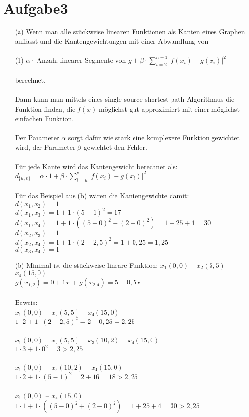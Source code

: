 \documentclass{article}
\begin{document}
\section*{Aufgabe3}
\begin{enumerate}
\item[(a)] Wenn man alle stückweise linearen Funktionen als Kanten eines Graphen auffasst und die Kantengewichtungen mit einer Abwandlung von \\\\
(1) $ \alpha \cdot$ Anzahl linearer Segmente von $g + \beta \cdot \sum_{i=2}^{n-1} \lvert f(x_i)-g(x_i) \lvert ^2$ \\\\
berechnet. \\\\
Dann kann man mittels eines single source shortest path Algorithmus die Funktion finden, die $f(x)$ möglichst gut approximiert mit einer möglichst einfachen Funktion. \\\\
Der Parameter $\alpha$ sorgt dafür wie stark eine komplexere Funktion gewichtet wird, der Parameter $\beta$ gewichtet den Fehler.\\\\
Für jede Kante wird das Kantengewicht berechnet als:\\
 $d_{\{u,v\}} = \alpha \cdot 1 + \beta \cdot \sum_{i=u}^{v} \lvert f(x_i)-g(x_i) \lvert ^2$\\\\
 Für das Beispiel aus (b) wären die Kantengewichte damit:\\
 $d(x_1,x_2) = 1$ \\
 $d(x_1,x_3) = 1 + 1 \cdot (5-1)^2 = 17$ \\
 $d(x_1,x_4) = 1 + 1 \cdot ((5-0)^2+(2-0)^2) = 1 + 25 + 4 = 30$ \\
 $d(x_2,x_3) = 1$ \\
 $d(x_2,x_4) = 1+1 \cdot (2-2,5)^2 = 1+0,25=1,25$ \\
 $d(x_3,x_4) = 1$\\
\item[(b)] Minimal ist die stückweise lineare Funktion: $x_1 (0,0)$ -- $x_2 (5,5)$ -- $x_4 (15,0)$ \\
$g(x_{1,2}) = 0 + 1x$ + $g(x_ {2,4}) = 5 - 0,5x$ \\\\
Beweis: \\
$x_1 (0,0)$ -- $x_2 (5,5)$ -- $x_4 (15,0)$\\
$1 \cdot 2 + 1 \cdot (2-2,5)^2 = 2+ 0,25 = 2,25$\\\\
$x_1 (0,0)$ -- $x_2 (5,5)$ -- $x_3 (10,2)$ -- $x_4 (15,0)$ \\
$1 \cdot 3 + 1 \cdot 0^2=3>2,25$\\\\
$x_1 (0,0)$ -- $x_3 (10,2)$ -- $x_4 (15,0)$ \\
$1 \cdot 2 + 1 \cdot (5-1)^2 = 2 + 16 = 18> 2,25$\\\\
$x_1 (0,0)$ -- $x_4 (15,0)$ \\
$1 \cdot 1 + 1 \cdot ((5-0)^2+(2-0)^2) = 1 + 25 + 4 = 30 >2,25$\\
\end{enumerate}
\end{document}
